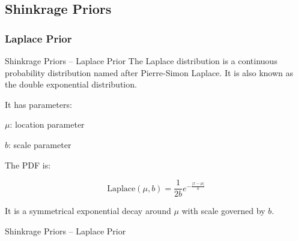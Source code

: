 \subsection{Shinkrage Priors}
\subsubsection{Laplace Prior}
\begin{frame}{Shinkrage Priors -- Laplace Prior}
    The Laplace distribution is a continuous probability distribution named after
    Pierre-Simon Laplace.
    It is also known as the double exponential distribution.

    It has parameters:
    \begin{vfilleditems}
        \item $\mu$: location parameter
        \item $b$: scale parameter
    \end{vfilleditems}

    The PDF is:

    $$
        \text{Laplace}(\mu, b) = \frac{1}{2b} e^{-\frac{| x - \mu |}{b}}
    $$

    \vfill

    It is a symmetrical exponential decay around $\mu$ with scale governed by $b$.
\end{frame}

\begin{frame}{Shinkrage Priors -- Laplace Prior}
	\centering
\end{frame}

